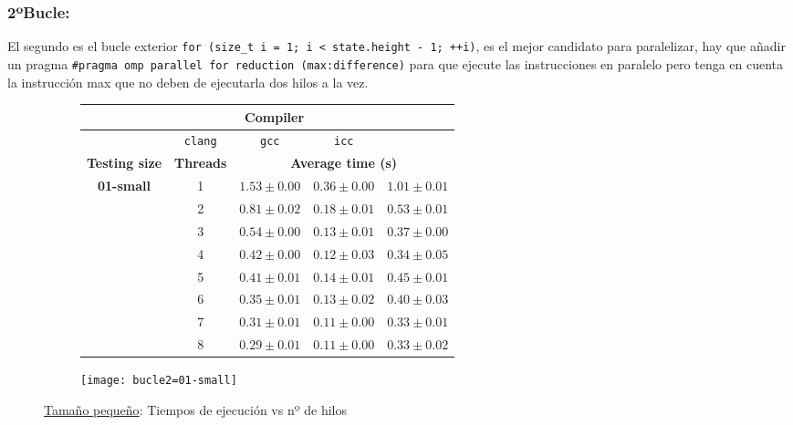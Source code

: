 
\subsubsection{\textbf{2ºBucle:}}

\par El segundo es el bucle exterior \texttt{for (size\_t i = 1; i < state.height - 1; ++i)}, es el mejor candidato para paralelizar, hay que añadir un
pragma \texttt{\#pragma omp parallel for reduction (max:difference)} para que ejecute las instrucciones en paralelo pero tenga en cuenta la
instrucción max que no deben de ejecutarla dos hilos a la vez.

\begin{figure}[H]
    \centering
    \begin{subfigure}{0.4\textwidth}
        \begin{adjustbox}{width=\textwidth} 
        \begin{tabular}{|c|c|c|c|c|}
            \hline
            \rowcolor{azul} \multicolumn{2}{|c|}{}&\multicolumn{3}{c|}{\textbf{Compiler}} \\ \hline
            \rowcolor{azul} \multicolumn{2}{|c|}{}&\texttt{clang}&\texttt{gcc}&\texttt{icc}\\ \hline
            \rowcolor{azul} \textbf{Testing size} & \textbf{Threads}&\multicolumn{3}{c|}{\textbf{Average time (s)}} \\ \hline
            \multirow{8}{1cm}{\textbf{01-small}} & 1 & \(1.53\pm{0.00}\) & \(0.36\pm{0.00}\) & \(1.01\pm{0.01}\) \\ \cline{2-5}
            & 2 & \(0.81\pm{0.02}\) & \(0.18\pm{0.01}\) & \(0.53\pm{0.01}\) \\ \cline{2-5}
            & 3 & \(0.54\pm{0.00}\) & \(0.13\pm{0.01}\) & \(0.37\pm{0.00}\) \\ \cline{2-5}
            & 4 & \(0.42\pm{0.00}\) & \(0.12\pm{0.03}\) & \(0.34\pm{0.05}\) \\ \cline{2-5}
            & 5 & \(0.41\pm{0.01}\) & \(0.14\pm{0.01}\) & \(0.45\pm{0.01}\) \\ \cline{2-5}
            & 6 & \(0.35\pm{0.01}\) & \(0.13\pm{0.02}\) & \(0.40\pm{0.03}\) \\ \cline{2-5}
            & 7 & \(0.31\pm{0.01}\) & \(0.11\pm{0.00}\) & \(0.33\pm{0.01}\) \\ \cline{2-5}
            & 8 & \(0.29\pm{0.01}\) & \(0.11\pm{0.00}\) & \(0.33\pm{0.02}\) \\ \hline
        \end{tabular}
        \end{adjustbox}
    \end{subfigure}
    \hfill
    \begin{subfigure}{0.5\textwidth}
        \texttt{[image: bucle2=01-small]}
    \end{subfigure}
    \caption{\underline{Tamaño pequeño}: Tiempos de ejecución vs nº de hilos}
    \label{fig:bucle2=01-small}
\end{figure}

